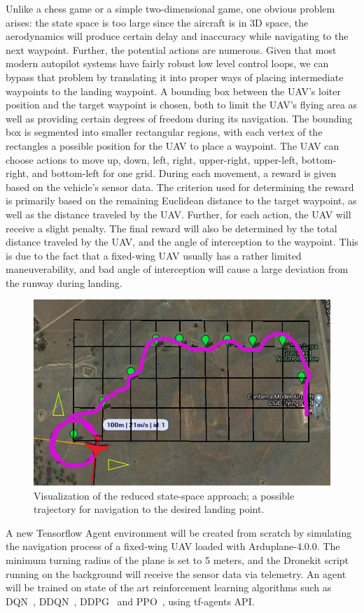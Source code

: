 \documentclass[10pt,twocolumn,letterpaper]{article}
\begin{document}
Unlike a chess game or a simple two-dimensional game, one obvious problem arises: the state space is too large since the aircraft is in 3D space, the aerodynamics will produce certain delay and inaccuracy while navigating to the next waypoint. Further, the potential actions are numerous. Given that most modern autopilot systems have fairly robust low level control loops, we can bypass that problem by translating it into proper ways of placing intermediate waypoints to the landing waypoint. A bounding box between the UAV's loiter position and the target waypoint is chosen, both to limit the UAV's flying area as well as providing certain degrees of freedom during its navigation. The bounding box is segmented into smaller rectangular regions, with each vertex of the rectangles a possible position for the UAV to place a waypoint. The UAV can choose actions to move up, down, left, right, upper-right, upper-left, bottom-right, and bottom-left for one grid. During each movement, a reward is given based on the vehicle's sensor data. The criterion used for determining the reward is primarily based on the remaining Euclidean distance to the target waypoint, as well as the distance traveled by the UAV. Further, for each action, the UAV will receive a slight penalty. The final reward will also be determined by the total distance traveled by the UAV, and the angle of interception to the waypoint. This is due to the fact that a fixed-wing UAV usually has a rather limited maneuverability, and bad angle of interception will cause a large deviation from the runway during landing.
\begin{figure}[t]
\begin{center}
   \includegraphics[width=1.0\linewidth]{path.jpg}
\end{center}
\caption{Visualization of the reduced state-space approach; a possible trajectory for navigation to the desired landing point.}
\label{fig:long}
\label{fig:onecol}
\end{figure}
A new Tensorflow Agent environment will be created from scratch by simulating the navigation process of a fixed-wing UAV loaded with Arduplane-4.0.0. The minimum turning radius of the plane is set to 5 meters, and the Dronekit script running on the background will receive the sensor data via telemetry. An agent will be trained on state of the art reinforcement learning algorithms such as DQN~\cite{Author6}, DDQN~\cite{Author7}, DDPG~\cite{Author8} and PPO~\cite{Author9}, using tf-agents API.
\end{document}
